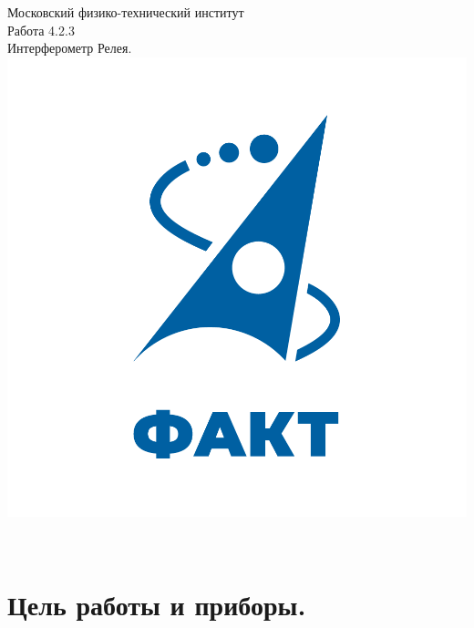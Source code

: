 \documentclass[a4paper,12pt]{article} %
\begin{document}

\begin{titlepage}
\begin{center}
	\large{Московский физико-технический институт}\\
	\vspace{100px}
	\LARGE{Работа 4.2.3}\\
	\LARGE{Интерферометр Релея.}\\
	\vspace{30px}
	\includegraphics[scale = 0.3]{fakt_logo.png}\\
\end{center}

\vfill
\begin{flushright}
	\\
\end{flushright}
\end{titlepage}

\newpage

\tableofcontents

\newpage

\section{Цель работы и приборы.}
\end{document}
